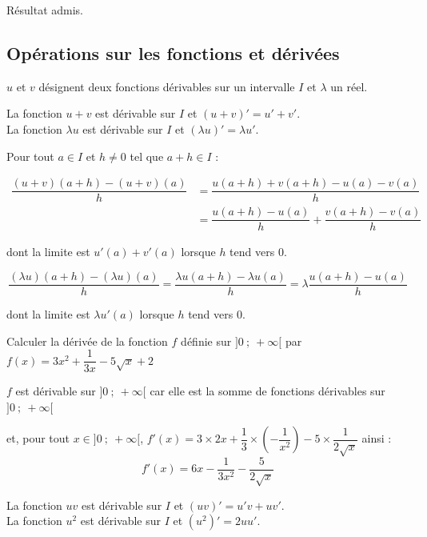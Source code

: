 \documentclass[french]{book}
\begin{document}
Résultat admis.

\subsection{Opérations sur les fonctions et dérivées}
$u$ et $v$ désignent deux fonctions dérivables sur un intervalle $I$ et $\lambda$ un réel.

\begin{prop}
La fonction $u+v$ est dérivable sur $I$ et  $(u+v)'=u'+v'$.\\
La fonction $\lambda u$ est dérivable sur $I$ et  $(\lambda u)'=\lambda u'$.
\end{prop}

\begin{demo}
Pour tout $a\in I$ et $h\neq 0$ tel que $a+h\in I$ :

\begin{align*}
\dfrac{(u+v)(a+h)-(u+v)(a)}{h}&=\dfrac{u(a+h)+v(a+h)-u(a)-v(a)}{h}\\
&=\dfrac{u(a+h)-u(a)}{h}+\dfrac{v(a+h)-v(a)}{h}
\end{align*}

dont la limite est $u'(a)+v'(a)$ lorsque $h$ tend vers 0.

\[\dfrac{(\lambda u)(a+h)-(\lambda u)(a)}{h}=\dfrac{\lambda u(a+h)-\lambda u(a)}{h}=\lambda \dfrac{u(a+h)-u(a)}{h}\]

dont la limite est $\lambda u'(a)$ lorsque $h$ tend vers 0.
\end{demo}

\begin{exemple}
Calculer la dérivée de la fonction $f$ définie sur $]0~;~+\infty[$ par $f(x)=3x^{2}+\dfrac{1}{3x}-5\sqrt{x}+2$
\end{exemple}


$f$ est dérivable sur $]0~;~+\infty[$ car elle est la somme de fonctions dérivables sur $]0~;~+\infty[$

et, pour tout $x\in]0~;~+\infty[$, $f'(x)=3\times 2x+\dfrac{1}{3}\times \left(-\dfrac{1}{x^{2}}\right)-5\times \dfrac{1}{2\sqrt{x}}$ ainsi :
\[f'(x)=6x-\dfrac{1}{3x^{2}}-\dfrac{5}{2\sqrt{x}}\]


\vspace*{2ex}
\begin{prop}
La fonction $uv$ est dérivable sur $I$ et  $(uv)'=u'v+uv'$.\\
La fonction $u^{2}$ est dérivable sur $I$ et  $(u^{2})'=2uu'$.

\end{prop}
\end{document}
